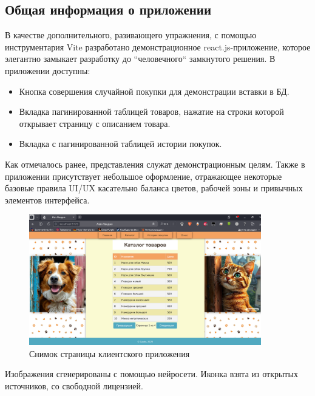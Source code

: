 \subsection{Общая информация о приложении}\label{subsec:frontcommon}
В качестве дополнительного, разивающего упражнения, с помощью инструментария Vite
разработано демонстрационное react.js-приложение, которое элегантно замыкает
разработку до ``человечного`` замкнутого решения.
В приложении доступны:
\begin{itemize}
    \item Кнопка совершения случайной покупки для демонстрации вставки в БД.
    \item Вкладка пагинированной таблицей товаров, нажатие на строки которой открывает страницу с описанием товара.
    \item Вкладка с пагинированной таблицей истории покупок.
\end{itemize}

Как отмечалось ранее, представления служат демонстрационным целям.
Также в приложении присутствует небольшое оформление, отражающее некоторые базовые правила UI/UX
касательно баланса цветов, рабочей зоны и привычных элементов интерфейса.

\begin{figure}[htbp]
    \centering
    \includegraphics[width=0.9\textwidth]{browser} %
    \caption{Снимок страницы клиентского приложения}\label{fig:browsershot}
\end{figure}

Изображения сгенерированы с помощью нейросети.
Иконка взята из открытых источников, со свободной лицензией.
